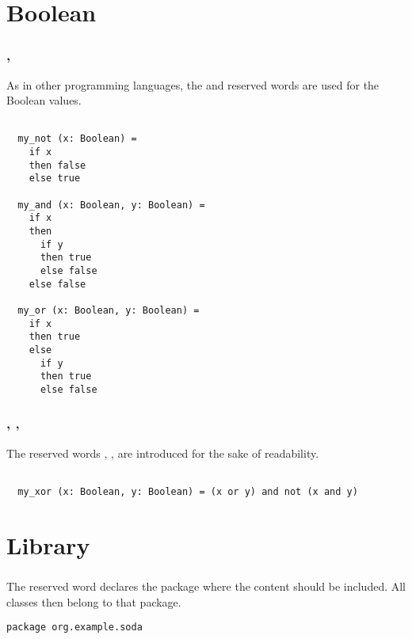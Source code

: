 \section{Boolean}

\subsubsection{\sfalse, \strue}

As in other programming languages, the \sfalse and \strue reserved words are used for the Boolean values.

\begin{lstlisting}[label={lst:exampleFalseTrue}]

  my_not (x: Boolean) =
    if x
    then false
    else true

  my_and (x: Boolean, y: Boolean) =
    if x
    then
      if y
      then true
      else false
    else false

  my_or (x: Boolean, y: Boolean) =
    if x
    then true
    else
      if y
      then true
      else false
\end{lstlisting}

\subsubsection{\snot, \sand, \sor}

The reserved words \snot, \sand, \sor are introduced for the sake of readability.

\begin{lstlisting}[label={lst:exampleNotAndOr}]

  my_xor (x: Boolean, y: Boolean) = (x or y) and not (x and y)

\end{lstlisting}


\section{Library}

\subsubsection{\spackage}

The reserved word \spackage declares the package where the content should be included.
All classes then belong to that package.

\begin{lstlisting}[label={lst:examplePackage}]
  package org.example.soda
\end{lstlisting}

